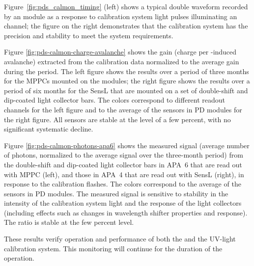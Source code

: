 Figure~\ref{fig:pds_calmon_timing} (left) shows a typical double waveform recorded by an   module as a response to calibration system
light pulses illuminating an  channel; the figure on the right demonstrates that the calibration system has the precision and stability to meet the system requirements. 

Figure \ref{fig:pds-calmon-charge-avalanche} shows the  gain (charge per \phel-induced avalanche) extracted from the calibration data normalized to the average gain during the period. The left figure shows the results over a period of three months for the MPPCs mounted on the  modules; the right figure shows the results over a period of six months for the SensL  that are mounted on a set of double-shift and dip-coated light collector bars. The colors correspond to different readout channels for the left figure and to the average of the sensors in PD modules for the right figure.
All sensors are stable at the level of a few percent, with no significant systematic decline. 

Figure \ref{fig:pds-calmon-photons-apa6} shows the measured signal (average number of photons, normalized to the average signal over the three-month period) from the double-shift and dip-coated light collector bars in APA~6 that are read out with MPPC  (left), and those in APA~4 that are read out with SensL  (right), in response to the calibration flashes. The colors correspond to the average of the sensors in PD modules. The measured signal is sensitive to stability in the intensity of the calibration system light and the response of the light collectors (including effects such as changes in wavelength shifter properties and  response). The ratio is stable at the few percent level.



These results verify operation and performance of both the  and the UV-light calibration system. This monitoring will continue for the duration of the  operation.

